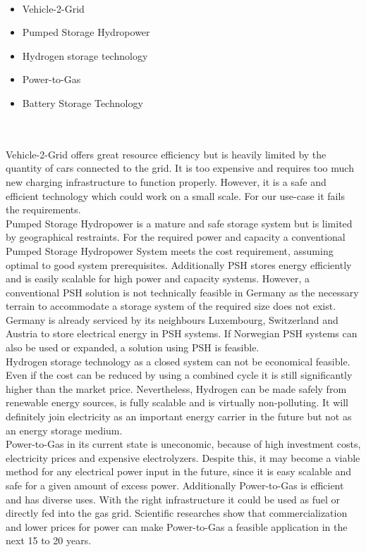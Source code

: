 \begin{parcolumns}[colwidths={1=2.5 cm, 2=10 cm, 3=2.5cm}]{3}
{\noindent
\\ 
\begin{itemize}
\item Vehicle-2-Grid
\item Pumped Storage Hydropower
\item Hydrogen storage technology
\item Power-to-Gas
\item Battery Storage Technology
\end{itemize}
\noindent \\ \\
Vehicle-2-Grid offers great resource efficiency but is heavily limited by the quantity of cars connected to the grid. It is too expensive and requires too much new charging infrastructure to function properly. However, it is a safe and efficient technology which could work on a small scale. For our use-case it fails the requirements. \\
\noindent
Pumped Storage Hydropower is a mature and safe storage system but is limited by geographical restraints. For the required power and capacity a conventional Pumped Storage Hydropower System meets the cost requirement, assuming optimal to good system prerequisites. Additionally PSH stores energy efficiently and is easily scalable for high power and capacity systems. However, a conventional PSH solution is not technically feasible in Germany as the necessary terrain to accommodate a storage system of the required size does not exist. Germany is already serviced by its neighbours Luxembourg, Switzerland and Austria to store electrical energy in PSH systems. If Norwegian PSH systems can also be used or expanded, a solution using PSH is feasible. \\  
\noindent
Hydrogen storage technology as a closed system can not be economical feasible. Even if the cost can be reduced by using a combined cycle it is still significantly higher than the market price. Nevertheless, Hydrogen can be made safely from renewable energy sources, is fully scalable and is virtually non-polluting. It will definitely join electricity as an important energy carrier in the future but not as an energy storage medium. \\
\noindent
Power-to-Gas in its current state is uneconomic, because of high investment costs, electricity prices and expensive electrolyzers. Despite this, it may become a viable method for any electrical power input in the future, since it is easy scalable and safe for a given amount of excess power. Additionally Power-to-Gas is efficient and has diverse uses. With the right infrastructure it could be used as fuel or directly fed into the gas grid. Scientific researches show that commercialization and lower prices for power can make Power-to-Gas a feasible application in the next 15 to 20 years. \\
}
\end{parcolumns}
